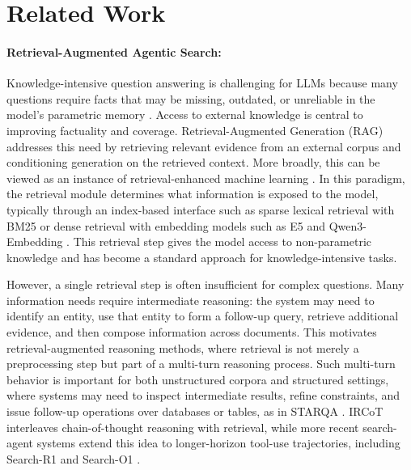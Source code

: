 \documentclass{llmxive}
\begin{document}
\section{Related Work}


\paragraph{Retrieval-Augmented Agentic Search:}


Knowledge-intensive question answering is challenging for LLMs because many questions require facts that may be missing, outdated, or unreliable in the model's parametric memory \citep{popqa}. Access to external knowledge is central to improving factuality and coverage. Retrieval-Augmented Generation (RAG) \citep{rag} addresses this need by retrieving relevant evidence from an external corpus and conditioning generation on the retrieved context. More broadly, this can be viewed as an instance of retrieval-enhanced machine learning \citep{REML}. In this paradigm, the retrieval module determines what information is exposed to the model, typically through an index-based interface such as sparse lexical retrieval with BM25 \citep{bm25} or dense retrieval with embedding models such as E5 \citep{e5} and Qwen3-Embedding \citep{qwen3embedding}. This retrieval step gives the model access to non-parametric knowledge and has become a standard approach for knowledge-intensive tasks.

However, a single retrieval step is often insufficient for complex questions. Many information needs require intermediate reasoning: the system may need to identify an entity, use that entity to form a follow-up query, retrieve additional evidence, and then compose information across documents. This motivates retrieval-augmented reasoning methods, where retrieval is not merely a preprocessing step but part of a multi-turn reasoning process. Such multi-turn behavior is important for both unstructured corpora and structured settings, where systems may need to inspect intermediate results, refine constraints, and issue follow-up operations over databases or tables, as in STARQA \citep{starqa}. IRCoT \citep{ircot} interleaves chain-of-thought reasoning with retrieval, while more recent search-agent systems extend this idea to longer-horizon tool-use trajectories, including Search-R1 \citep{search-r1} and Search-O1 \citep{search-o1}.
\end{document}
